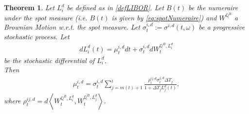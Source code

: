 \documentclass[12pt]{article}
\newtheorem{theorem}{Theorem}[section]
\begin{document}
	\begin{theorem}\label{theo:defDriftTheo}
		Let $L^d_i$ be defined as in \cref{defLIBOR}. Let $B(t)$ be the numeraire under the spot measure (i.e. $B(t)$ is given by \cref{eq:spotNumeraire}) and $W^{\mathbb{Q}^B}$ a Brownian Motion w.r.t. the spot measure.
		Let $\sigma^{i, d}_t:=\sigma^{i, d}(t, \omega)$ be a progressive stochastic process. Let 
		\begin{align}
			dL^d_i(t) = \mu^{i, d}_t dt + \sigma^{i, d}_t dW^{\mathbb{Q}^B, L^d_i}_t
		\end{align}
		be the stochastic differential of $L^d_i$.\\
		Then 
		\begin{align}\label{defDriftTheo}
			\mu^{i, d}_t = \sigma^{i, d}_t\sum_{j=m(t)+1}^{i}\frac{\rho^{i j, d}_t \sigma^{j, d}_t\Delta T_j}{1 + \Delta T_j L^d_j(t)},
		\end{align}
		where $ \rho^{i j, d}_t = d\left\langle W^{\mathbb{Q}^B, L^d_i}_t,  W^{\mathbb{Q}^B, L^d_j}_t \right\rangle $.
	\end{theorem}
	
\end{document}
